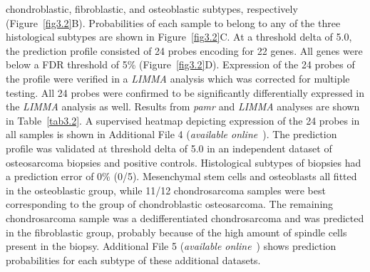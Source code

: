 chondroblastic, fibroblastic, and osteoblastic subtypes,
respectively (Figure~\ref{fig3.2}B). Probabilities of each sample to
belong to any of the three histological subtypes are
shown in Figure~\ref{fig3.2}C. At a threshold delta of 5.0, the prediction
profile consisted of 24 probes encoding for 22
genes. All genes were below a FDR threshold of 5\% (Figure~\ref{fig3.2}D). Expression of the 24 probes of the profile were
verified in a {\it LIMMA} analysis which was corrected
for multiple testing. All 24 probes were confirmed
to be significantly differentially expressed in the
{\it LIMMA} analysis as well. Results from {\it pamr} and
{\it LIMMA} analyses are shown in Table~\ref{tab3.2}. A supervised
heatmap depicting expression of the 24 probes in all
samples is shown in Additional File 4 ({\it available online}~\cite{ch3additional}). The prediction
profile was validated at threshold delta of 5.0 in an independent
dataset of osteosarcoma biopsies and positive
controls. Histological subtypes of biopsies had a prediction
error of 0\% (0/5). Mesenchymal stem cells and
osteoblasts all fitted in the osteoblastic group, while
11/12 chondrosarcoma samples were best corresponding to
the group of chondroblastic osteosarcoma. The remaining
chondrosarcoma sample was a dedifferentiated
chondrosarcoma and was predicted in the fibroblastic
group, probably because of the high amount of spindle
cells present in the biopsy. Additional File 5 ({\it available online}~\cite{ch3additional}) shows prediction
probabilities for each subtype of these additional
datasets.
%
